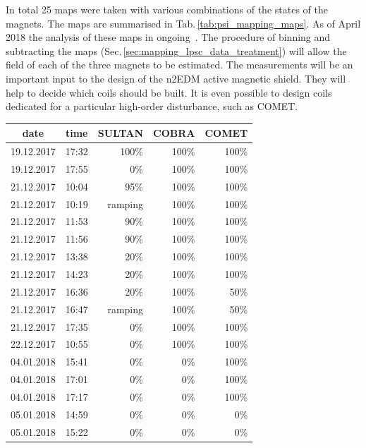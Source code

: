In total 25 maps were taken with various combinations of the states of the magnets.
The maps are summarised in Tab.\,\ref{tab:psi_mapping_maps}.
As of April 2018 the analysis of these maps in ongoing~\cite{EmmeneggerThesis}.
The procedure of binning and subtracting the maps (Sec.\,\ref{sec:mapping_lpsc_data_treatment}) will allow the field of each of the three magnets to be estimated.
The measurements will be an important input to the design of the n2EDM active magnetic shield.
They will help to decide which coils should be built.
It is even possible to design coils dedicated for a particular high-order disturbance, such as COMET\@.

\begin{table}
  \centering
  \begin{tabular}{ccrrr}
    date        &  time   &  SULTAN   &  COBRA  &  COMET \\ \midrule
    19.12.2017  &  17:32  &  100\%    &  100\%  &  100\%  \\
    19.12.2017  &  17:55  &  0\%      &  100\%  &  100\%  \\
    21.12.2017  &  10:04  &  95\%     &  100\%  &  100\%  \\
    21.12.2017  &  10:19  &  ramping  &  100\%  &  100\%  \\
    21.12.2017  &  11:53  &  90\%     &  100\%  &  100\%  \\
    21.12.2017  &  11:56  &  90\%     &  100\%  &  100\%  \\
    21.12.2017  &  13:38  &  20\%     &  100\%  &  100\%  \\
    21.12.2017  &  14:23  &  20\%     &  100\%  &  100\%  \\
    21.12.2017  &  16:36  &  20\%     &  100\%  &  50\%   \\
    21.12.2017  &  16:47  &  ramping  &  100\%  &  50\%   \\
    21.12.2017  &  17:35  &  0\%      &  100\%  &  100\%  \\
    22.12.2017  &  10:55  &  0\%      &  100\%  &  100\%  \\
    04.01.2018  &  15:41  &  0\%      &  0\%    &  100\%  \\
    04.01.2018  &  17:01  &  0\%      &  0\%    &  100\%  \\
    04.01.2018  &  17:17  &  0\%      &  0\%    &  100\%  \\
    05.01.2018  &  14:59  &  0\%      &  0\%    &  0\%    \\
    05.01.2018  &  15:22  &  0\%      &  0\%    &  0\%    \\

\end{tabular}
\end{table}
